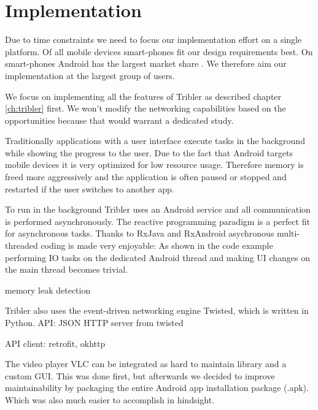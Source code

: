 \chapter{Implementation}
\label{ch:implementation}


Due to time constraints we need to focus our implementation effort on a single platform.
Of all mobile devices smart-phones fit our design requirements best.
On smart-phones Android has the largest market share \cite{https://www.statista.com/statistics/266136/global-market-share-held-by-smartphone-operating-systems/}.
We therefore aim our implementation at the largest group of users.

We focus on implementing all the features of Tribler as described chapter \ref{ch:tribler} first.
We won't modify the networking capabilities based on the opportunities because that would warrant a dedicated study.


Traditionally applications with a user interface execute tasks in the background while showing the progress to the user.
Due to the fact that Android targets mobile devices it is very optimized for low resource usage.
Therefore memory is freed more aggressively and the application is often paused or stopped and restarted if the user switches to another app.

To run in the background Tribler uses an Android service and all communication is performed asynchronously.
The reactive programming paradigm is a perfect fit for asynchronous tasks.
Thanks to RxJava and RxAndroid asychronous multi-threaded coding is made very enjoyable:
As shown in the code example performing IO tasks on the dedicated Android thread and making UI changes on the main thread becomes trivial.


memory leak detection


Tribler also uses the event-driven networking engine Twisted, which is written in Python.
API: JSON HTTP server from twisted

API client: retrofit, okhttp


The video player VLC can be integrated as hard to maintain library and a custom GUI.
This was done first, but afterwards we decided to improve maintainability by packaging the entire Android app installation package (.apk).
Which was also much easier to accomplish in hindsight.

